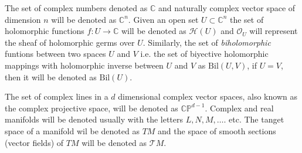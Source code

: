 \documentclass[12pt,twoside,a4paper]{report}
\newcommand{\co}{\ensuremath{\mathbb C }}
\newcommand{\con}{\ensuremath{\mathbb{C}^n}}
\newcommand{\cp}{\ensuremath{\mathbb{CP}}}
\newcommand{\osheaf}{\ensuremath{\mathcal O }}
\begin{document}
The set of complex numbers denoted as $\co$ and naturally complex vector space of dimension $n$ will be denoted as $\con$. Given an open set $U\subset\con$ the set of holomorphic functions $f:U\rightarrow\co$ will be denoted as $\mathcal{H}(U)$ and $\osheaf_{U}$ will represent the sheaf of holomorphic germs over $U$. Similarly, the set of \emph{biholomorphic} funtions between two spaces $U$ and $V$ i.e. the set of biyective holomorphic mappings with holomorphic inverse between $U$ and $V$ as $\mathrm{Bil}(U,V)$, if $U=V$, then it will be denoted as $\mathrm{Bil}(U).$

The set of complex lines in a $d$ dimensional complex vector spaces, also known as the complex projective space, will be denoted as $\cp^{d-1}$. Complex and real manifolds will be denoted usually with the letters $L, N, M,\dots$. etc. The tanget space of a manifold wil be denoted as $TM$ and the space of smooth sections (vector fields) of $TM$ will be denoted as $\mathcal{T}M$.
\end{document}
